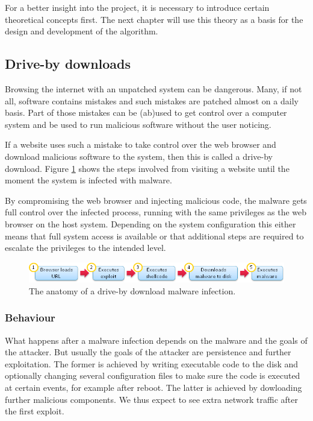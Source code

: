 For a better insight into the project, it is necessary to introduce certain theoretical concepts first. The next chapter will use this theory as a basis for the design and development of the algorithm.

\subsection{Drive-by downloads}

Browsing the internet with an unpatched system can be dangerous. Many, if not all, software contains mistakes and such mistakes are patched almost on a daily basis. Part of those mistakes can be (ab)used to get control over a computer system and be used to run malicious software without the user noticing.

If a website uses such a mistake to take control over the web browser and download malicious software to the system, then this is called a drive-by download\cite{Le2013}. Figure \ref{fig:dbdownload} shows the steps involved from visiting a website until the moment the system is infected with malware.

By compromising the web browser and injecting malicious code, the malware gets full control over the infected process, running with the same privileges as the web browser on the host system. Depending on the system configuration this either means that full system access is available or that additional steps are required to escalate the privileges to the intended level.


\begin{figure}[h]
    \centering
    \includegraphics[width=12cm]{Images/drive-by-download.png}
    \caption{The anatomy of a drive-by download malware infection. \cite{dbdownload-anatomy}}
    \label{fig:dbdownload}
\end{figure}

\subsubsection{Behaviour}
\label{sec:behavior}

What happens after a malware infection depends on the malware and the goals of the attacker. But usually the goals of the attacker are persistence and further exploitation. The former is achieved by writing executable code to the disk and optionally changing several configuration files to make sure the code is executed at certain events, for example after reboot. The latter is achieved by dowloading further malicious components. We thus expect to see extra network traffic after the first exploit.

